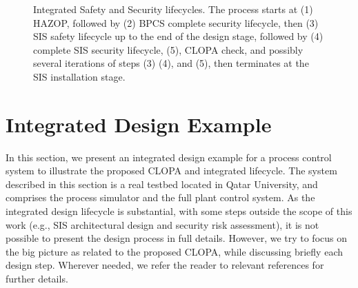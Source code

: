 \documentclass[journal]{IEEEtran}
\begin{document}
\begin{figure}[]
{}
\caption{Integrated Safety and Security lifecycles. The process starts at (1) HAZOP, followed by (2) BPCS complete security lifecycle, then (3) SIS safety lifecycle up to the end of the design stage, followed by (4) complete SIS security lifecycle, (5), CLOPA check, and possibly several iterations of steps (3) (4), and (5), then terminates at the SIS installation stage.}
\label{fig:codesign}
\end{figure}

\section{Integrated Design Example}  \label{sec:case-study}
In this section, we present an integrated design example for a process control system to illustrate the proposed CLOPA and integrated lifecycle. The system described in this section is a real testbed located in Qatar University, and comprises the process simulator and the full plant control system. As the integrated design lifecycle is substantial, with some steps outside the scope of this work (e.g., SIS architectural design and security risk assessment), it is not possible to present the design process in full details. However, we try to focus on the big picture as related to the proposed CLOPA, while discussing briefly each design step. Wherever needed, we refer the reader to relevant references for further details.
\end{document}
